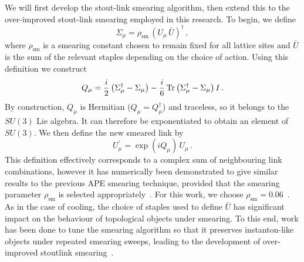 We will first develop the stout-link smearing algorithm, then extend this to the over-improved stout-link smearing employed in this research. To begin, we define
%
\begin{equation}
\Sigma_\mu = \rho_\text{sm}\,(U_\mu\,\bar{U})^\dagger\, ,
\end{equation}
%
where $\rho_\text{sm}$ is a smearing constant chosen to remain fixed for all lattice sites and $\bar{U}$ is the sum of the relevant staples depending on the choice of action. Using this definition we construct
%
\begin{equation}
Q_\mu = \frac{i}{2}\left( \Sigma_\mu^\dagger - \Sigma_\mu \right) - \frac{i}{6}\operatorname{Tr}\left(\Sigma_\mu^\dagger - \Sigma_\mu\right)I\, .
\end{equation}
By construction, $Q_\mu$ is Hermitian ($Q_\mu = Q_\mu^\dagger$) and traceless, so it belongs to the $SU(3)$ Lie algebra. It can therefore be exponentiated to obtain an element of $SU(3)$. We then define the new smeared link by
%
\begin{equation}
U_\mu^\prime = \exp(iQ_\mu)\,U_\mu\, .
\end{equation}
%
This definition effectively corresponds to a complex sum of neighbouring link combinations, however it has numerically been demonstrated to give similar results to the previous APE smearing technique, provided that the smearing parameter $\rho_\text{sm}$ is selected appropriately~\cite{Morningstar:2003gk}. For this work, we choose $\rho_\text{sm}=0.06$~\cite{Moran:2008ra}. As in the case of cooling, the choice of staples used to define $\bar{U}$ has significant impact on the behaviour of topological objects under smearing. To this end, work has been done to tune the smearing algorithm so that it preserves instanton-like objects under repeated smearing sweeps, leading to the development of over-improved stoutlink smearing~\cite{Moran:2008ra}.\\

